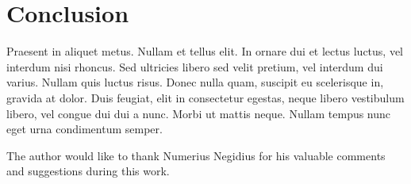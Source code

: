 \section{Conclusion}

Praesent in aliquet metus. Nullam et tellus elit. In ornare dui et lectus luctus, vel interdum nisi rhoncus. Sed ultricies libero sed velit pretium, vel interdum dui varius. Nullam quis luctus risus. Donec nulla quam, suscipit eu scelerisque in, gravida at dolor. Duis feugiat, elit in consectetur egestas, neque libero vestibulum libero, vel congue dui dui a nunc. Morbi ut mattis neque. Nullam tempus nunc eget urna condimentum semper.

\begin{acks}
The author would like to thank Numerius Negidius for his valuable comments and suggestions during this work.
\end{acks}
